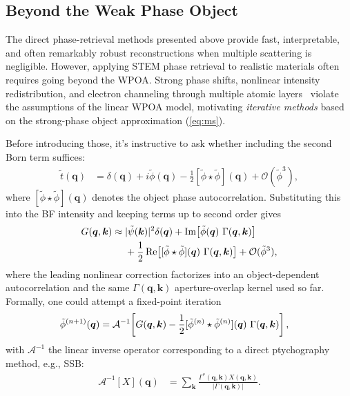 \documentclass[pdflatex,sn-aps,iicol]{sn-jnl}%
\begin{document}
\subsection{Beyond the Weak Phase Object}

The direct phase-retrieval methods presented above provide fast, interpretable, and often remarkably robust reconstructions when multiple scattering is negligible.
However, applying STEM phase retrieval to realistic materials often requires going beyond the WPOA.
Strong phase shifts, nonlinear intensity redistribution, and electron channeling through multiple atomic layers~\cite{Williams_2009,Carter_2016,Kirkland_2020}
violate the assumptions of the linear WPOA model, motivating \emph{iterative methods} based on the strong-phase object approximation (\cref{eq:ms}).

Before introducing those, it's instructive to ask whether including the second Born term suffices:
\begin{align}
\tilde{t}(\boldsymbol{q})
&=
\delta(\boldsymbol{q})
+ i \tilde{\phi}(\boldsymbol{q})
- \frac{1}{2} [\tilde{\phi} \star \tilde{\phi}](\boldsymbol{q})
+ \mathcal{O}(\tilde{\phi}^3),
\end{align}
where $[\tilde{\phi} \star \tilde{\phi}](\boldsymbol{q})$ denotes the object phase autocorrelation.
Substituting this into the BF intensity and keeping terms up to second order gives
\begin{align}
G(\boldsymbol{q},\boldsymbol{k})
\approx\;&
\lvert \tilde{\psi}(\boldsymbol{k}) \rvert^2 \delta(\boldsymbol{q}) +
\operatorname{Im}\!\left[\tilde{\phi}(\boldsymbol{q}) \,\thinspace \Gamma(\boldsymbol{q},\boldsymbol{k})\right]
\nonumber\\
&+
\frac{1}{2}
\operatorname{Re}\!\left[[\tilde{\phi} \star \tilde{\phi}](\boldsymbol{q}) \,\thinspace \Gamma(\boldsymbol{q},\boldsymbol{k})\right]
+
\mathcal{O}(\tilde{\phi}^3),
\label{eq:beyond-wpoa}
\end{align}
where the leading nonlinear correction factorizes into an object-dependent autocorrelation and the same $\Gamma(\boldsymbol{q},\boldsymbol{k})$ aperture-overlap kernel used so far.
Formally, one could attempt a fixed-point iteration
\begin{align}
\tilde{\phi}^{(n+1)}(\boldsymbol{q})
&=
\mathcal{A}^{-1}\!\left[
G(\boldsymbol{q},\boldsymbol{k})
-
\frac{1}{2}
[\tilde{\phi}^{(n)} \star \tilde{\phi}^{(n)}](\boldsymbol{q})
\,\thinspace
\Gamma(\boldsymbol{q},\boldsymbol{k})
\right],
\end{align}
with $\mathcal{A}^{-1}$ the linear inverse operator corresponding to a direct ptychography method, e.g., SSB:
\begin{align}
\mathcal{A}^{-1}[X](\boldsymbol{q})
&=
\sum_{\boldsymbol{k}}
\frac{
\Gamma^{*}(\boldsymbol{q},\boldsymbol{k}) X(\boldsymbol{q},\boldsymbol{k})
}{
\lvert \Gamma(\boldsymbol{q},\boldsymbol{k}) \rvert
}.
\end{align}
\end{document}
